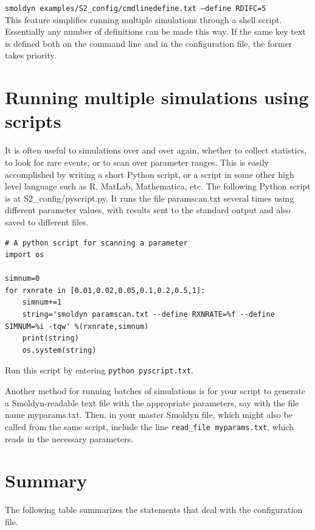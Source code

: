 \documentclass {scrbook}
\newcommand {\ttt} {\texttt}
\begin{document}
\ttt{smoldyn examples/S2\_config/cmdlinedefine.txt --define RDIFC=5}\\

This feature simplifies running multiple simulations through a shell script. Essentially any number of definitions can be made this way. If the same key text is defined both on the command line and in the configuration file, the former takes priority.

\section{Running multiple simulations using scripts}

It is often useful to simulations over and over again, whether to collect statistics, to look for rare events, or to scan over parameter ranges. This is easily accomplished by writing a short Python script, or a script in some other high level language such as R, MatLab, Mathematica, etc. The following Python script is at S2\_config/pyscript.py. It runs the file paramscan.txt several times using different parameter values, with results sent to the standard output and also saved to different files.

\begin{lstlisting}[style=SSAPython]
# A python script for scanning a parameter
import os

simnum=0
for rxnrate in [0.01,0.02,0.05,0.1,0.2,0.5,1]:
	simnum+=1
	string='smoldyn paramscan.txt --define RXNRATE=%f --define SIMNUM=%i -tqw' %(rxnrate,simnum)
	print(string)
	os.system(string)
\end{lstlisting}
Run this script by entering \ttt{python pyscript.txt}.

Another method for running batches of simulations is for your script to generate a Smoldyn-readable text file with the appropriate parameters, say with the file name myparams.txt. Then, in your master Smoldyn file, which might also be called from the same script, include the line \ttt{read\_file myparams.txt}, which reads in the necessary parameters.

\section{Summary}

The following table summarizes the statements that deal with the configuration file.
\end{document}
